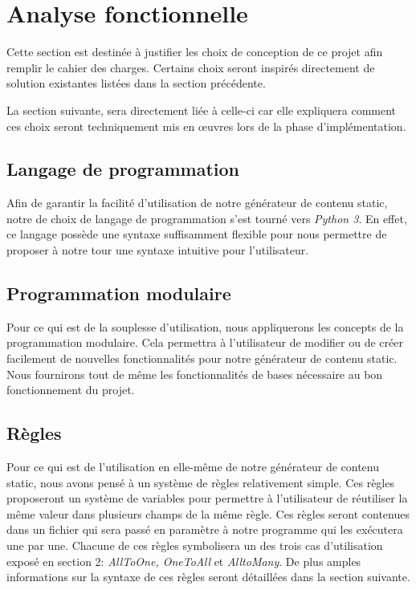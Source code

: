 \section{Analyse fonctionnelle}

	Cette section est destinée à justifier les choix de conception de ce projet afin remplir le cahier des charges. Certains choix seront inspirés directement de solution existantes listées dans la section précédente.
	
	La section suivante, sera directement liée à celle-ci car elle expliquera comment ces choix seront techniquement mis en œuvres lors de la phase d'implémentation.

	\subsection{Langage de programmation}
		Afin de garantir la facilité d'utilisation de notre générateur de contenu static, notre de choix de langage de programmation s'est tourné vers \textit{Python 3}. En effet, ce langage possède une syntaxe suffisamment flexible pour nous permettre de proposer à notre tour une syntaxe intuitive pour l'utilisateur.
		
	\subsection{Programmation modulaire}
		Pour ce qui est de la souplesse d'utilisation, nous appliquerons les concepts de la programmation modulaire. Cela permettra à l'utilisateur de modifier ou de créer facilement de nouvelles fonctionnalités pour notre générateur de contenu static. Nous fournirons tout de même les fonctionnalités de bases nécessaire au bon fonctionnement du projet.

	\subsection{Règles}
		Pour ce qui est de l'utilisation en elle-même de notre générateur de contenu static, nous avons pensé à un système de règles relativement simple. Ces règles proposeront un système de variables pour permettre à l'utilisateur de réutiliser la même valeur dans plusieurs champs de la même règle. Ces règles seront contenues dans un fichier qui sera passé en paramètre à notre programme qui les exécutera une par une. Chacune de ces règles symbolisera un des trois cas d'utilisation exposé en section 2: \textit{AllToOne, OneToAll} et \textit{AlltoMany}. De plus amples informations sur la syntaxe de ces règles seront détaillées dans la section suivante.
	
